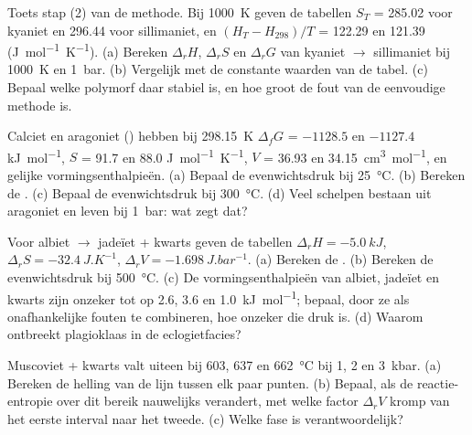 \begin{exercise}[$\star\star$]\label{exo:b2:metamorphic-facies:6}
Toets stap (2) van de methode. Bij \qty{1000}{K} geven de tabellen $S_T$ = 285.02 voor kyaniet
en 296.44 voor sillimaniet, en $(H_T - H_{298})/T$ = 122.29 en 121.39
(\unit{J.mol^{-1}.K^{-1}}). (a) Bereken $\Delta_r H$, $\Delta_r S$ en $\Delta_r G$ van
kyaniet $\to$ sillimaniet bij \qty{1000}{K} en \qty{1}{bar}. (b) Vergelijk met de constante
waarden van de tabel. (c) Bepaal welke polymorf daar stabiel is, en hoe groot de fout van
de eenvoudige methode is.
\end{exercise}

\begin{exercise}[$\star\star$]\label{exo:b2:metamorphic-facies:7}
Calciet en aragoniet () hebben bij \qty{298.15}{K} $\Delta_f G$ = $-1128.5$ en
$-1127.4$ \unit{kJ.mol^{-1}}, $S$ = 91.7 en 88.0 \unit{J.mol^{-1}.K^{-1}}, $V$ = 36.93
en \qty{34.15}{cm^3.mol^{-1}}, en gelijke vormingsenthalpieën. (a) Bepaal de
evenwichtsdruk bij \qty{25}{\celsius}. (b) Bereken de . (c) Bepaal de
evenwichtsdruk bij \qty{300}{\celsius}. (d) Veel schelpen bestaan uit aragoniet en
leven bij \qty{1}{bar}: wat zegt dat?
\end{exercise}

\begin{exercise}[$\star\star$]\label{exo:b2:metamorphic-facies:8}
Voor albiet $\to$ jadeïet + kwarts geven de tabellen $\Delta_r H = \qty{-5.0}{kJ}$,
$\Delta_r S = \qty{-32.4}{J.K^{-1}}$, $\Delta_r V = \qty{-1.698}{J.bar^{-1}}$. (a)
Bereken de . (b) Bereken de evenwichtsdruk bij \qty{500}{\celsius}.
(c) De vormingsenthalpieën van albiet, jadeïet en kwarts zijn onzeker tot op 2.6, 3.6
en \qty{1.0}{kJ.mol^{-1}}; bepaal, door ze als onafhankelijke fouten te combineren, hoe onzeker die
druk is. (d) Waarom ontbreekt plagioklaas in de eclogietfacies?
\end{exercise}

\begin{exercise}[$\star\star$]\label{exo:b2:metamorphic-facies:9}
Muscoviet + kwarts valt uiteen bij 603, 637 en \qty{662}{\celsius} bij 1, 2 en
\qty{3}{kbar}. (a) Bereken de helling van de lijn tussen elk paar punten. (b) Bepaal, als de
reactie-entropie over dit bereik nauwelijks verandert, met welke factor $\Delta_r V$
kromp van het eerste interval naar het tweede. (c) Welke fase is verantwoordelijk?
\end{exercise}

